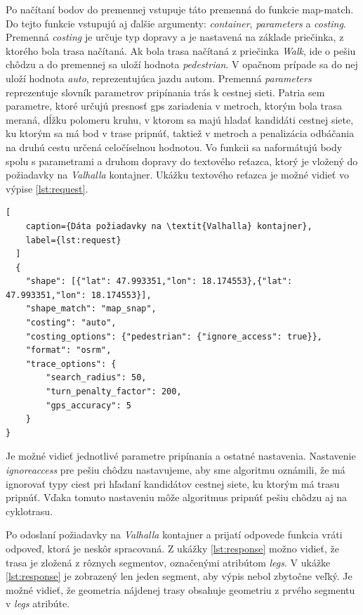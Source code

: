 Po načítaní bodov do premennej vstupuje táto premenná do funkcie map-match. Do tejto funkcie vstupujú aj ďalšie argumenty: \textit{container}, \textit{parameters} a \textit{costing}. Premenná \textit{costing} je určuje typ dopravy a je nastavená na základe priečinka, z ktorého bola trasa načítaná. Ak bola trasa načítaná z priečinka \textit{Walk}, ide o pešiu chôdzu a do premennej sa uloží hodnota \textit{pedestrian}. V opačnom prípade sa do nej uloží hodnota \textit{auto}, reprezentujúca jazdu autom. Premenná \textit{parameters} reprezentuje slovník parametrov pripínania trás k cestnej sieti. Patria sem parametre, ktoré určujú presnosť \acrshort{gps} zariadenia v metroch, ktorým bola trasa meraná, dĺžku polomeru kruhu, v ktorom sa majú hladať kandidáti cestnej siete, ku ktorým sa má bod v trase pripnúť, taktiež v metroch a penalizácia odbáčania na druhú cestu určená celočíselnou hodnotou. Vo funkcii sa naformátujú body spolu s parametrami a druhom dopravy do textového reťazca, ktorý je vložený do požiadavky na \textit{Valhalla} kontajner. Ukážku textového reťazca je možné vidieť vo výpise \ref{lst:request}.
\begin{lstlisting}[
    caption={Dáta požiadavky na \textit{Valhalla} kontajner},
    label={lst:request}
  ]
  {
    "shape": [{"lat": 47.993351,"lon": 18.174553},{"lat": 47.993351,"lon": 18.174553}],
    "shape_match": "map_snap",
    "costing": "auto",
    "costing_options": {"pedestrian": {"ignore_access": true}},
    "format": "osrm",
    "trace_options": {
        "search_radius": 50,
        "turn_penalty_factor": 200,
        "gps_accuracy": 5
    }
}
  \end{lstlisting}
Je možné vidieť jednotlivé parametre pripínania a ostatné nastavenia. Nastavenie \textit{ignore\textunderscore access} pre pešiu chôdzu nastavujeme, aby sme algoritmu oznámili, že má ignorovať typy ciest pri hľadaní kandidátov cestnej siete, ku ktorým má trasu pripnúť. Vďaka tomuto nastaveniu môže algoritmus pripnúť pešiu chôdzu aj na cyklotrasu.

Po odoslaní požiadavky na \textit{Valhalla} kontajner a prijatí odpovede funkcia vráti odpoveď, ktorá je neskôr spracovaná. Z ukážky \ref{lst:response} možno vidieť, že trasa je zložená z rôznych segmentov, označenými atribútom \textit{legs}. V ukážke \ref{lst:response} je zobrazený len jeden segment, aby výpis nebol zbytočne veľký. Je možné vidieť, že geometria nájdenej trasy obsahuje geometriu z prvého segmentu v \textit{legs} atribúte.

